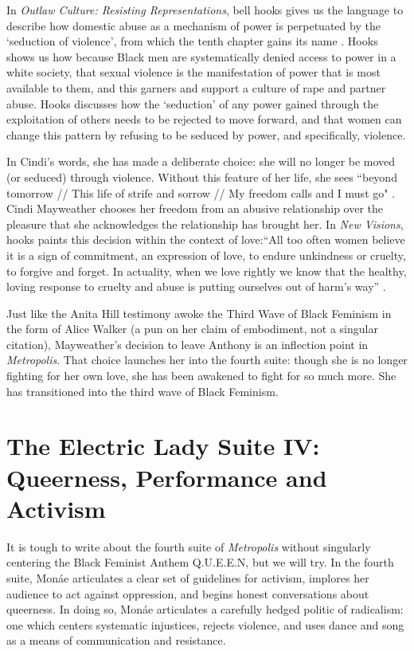 \documentclass[a4paper, 11pt]{article} %
\begin{document}
In \emph{Outlaw Culture: Resisting Representations}, bell hooks gives us the language to describe how domestic abuse as a mechanism of power is perpetuated by the `seduction of violence', from which the tenth chapter gains its name \cite{hooks1994outlaw}.
Hooks shows us how because Black men are systematically denied access to power in a white society, that sexual violence is the manifestation of power that is most available to them, and this garners and support a culture of rape and partner abuse.
Hooks discusses how the `seduction' of any power gained through the exploitation of others needs to be rejected to move forward, and that women can change this pattern by refusing to be seduced by power, and specifically, violence.


In Cindi's words, she has made a deliberate choice: she will no longer be moved (or seduced) through violence. 
Without this feature of her life, she sees ``beyond tomorrow // This life of strife and sorrow // My freedom calls and I must go" \cite{babopbyeya}.
Cindi Mayweather chooses her freedom from an abusive relationship over the pleasure that she acknowledges the relationship has brought her.
In \emph{New Visions}, hooks paints this decision within the context of love:``All too often women believe it is a sign of commitment, an expression of love, to endure unkindness or cruelty, to forgive and forget. In actuality, when we love rightly we know that the healthy, loving response to cruelty and abuse is putting ourselves out of harm's way'' \cite{newvisions}.

Just like the Anita Hill testimony awoke the Third Wave of Black Feminism in the form of Alice Walker \cite{alicewalker} (a pun on her claim of embodiment, not a singular citation), Mayweather's decision to leave Anthony is an inflection point in \emph{Metropolis}.
That choice launches her into the fourth suite: though she is no longer fighting for her own love, she has been awakened to fight for so much more. 
She has transitioned into the third wave of Black Feminism.



\section*{The Electric Lady Suite IV: Queerness, Performance and Activism}

It is tough to write about the fourth suite of \emph{Metropolis} without singularly centering the Black Feminist Anthem Q.U.E.E.N, but we will try.
In the fourth suite, Mon\'ae articulates a clear set of guidelines for activism, implores her audience to act against oppression, and begins honest conversations about queerness.
In doing so, Mon\'ae articulates a carefully hedged politic of radicalism: one which centers systematic injustices, rejects violence, and uses dance and song as a means of communication and resistance.
\end{document}
